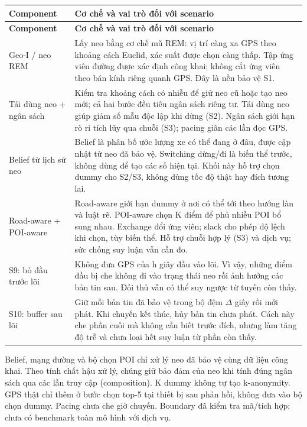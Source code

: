 \documentclass[10pt,a4paper]{article}
\begin{document}
\begingroup\small
\begin{longtable}{@{}P{4.105cm}P{12.814cm}@{}}
\toprule
\textbf{Component} & \textbf{Cơ chế và vai trò đối với scenario}\\\midrule
\endfirsthead
\toprule
\textbf{Component} & \textbf{Cơ chế và vai trò đối với scenario}\\\midrule
\endhead
\bottomrule\endfoot
Geo-I / neo REM & Lấy neo bằng cơ chế mũ REM: vị trí càng xa GPS theo khoảng cách Euclid, xác suất được chọn càng thấp. Tập ứng viên đường được xác định công khai; không cắt ứng viên theo bán kính riêng quanh GPS. Đây là nền bảo vệ S1.\\
\addlinespace[3pt]
Tái dùng neo + ngân sách & Kiểm tra khoảng cách có nhiễu để giữ neo cũ hoặc tạo neo mới; cả hai bước đều tiêu ngân sách riêng tư. Tái dùng neo giúp giảm số mẫu độc lập khi dừng (S2). Ngân sách giới hạn rò rỉ tích lũy qua chuỗi (S3); pacing giãn các lần đọc GPS.\\
\addlinespace[3pt]
Belief từ lịch sử neo & Belief là phân bố ước lượng xe có thể đang ở đâu, được cập nhật từ neo đã bảo vệ. Switching dừng/đi là biến thể trước, không dùng để tạo các số hiện tại. Khối này hỗ trợ chọn dummy cho S2/S3, không dùng tốc độ thật hay đích tương lai.\\
\addlinespace[3pt]
Road-aware + POI-aware & Road-aware giới hạn dummy ở nơi có thể tới theo hướng làn và luật rẽ. POI-aware chọn K điểm để phủ nhiều POI bổ sung nhau. Exchange đổi ứng viên; slack cho phép độ lệch khi chọn, tùy biến thể. Hỗ trợ chuỗi hợp lý (S3) và dịch vụ; sức chống suy luận vẫn cần đo.\\
\addlinespace[3pt]
S9: bỏ đầu trước lõi & Không đưa GPS của h giây đầu vào lõi. Vì vậy, những điểm đầu bị che không đi vào trạng thái neo rồi ảnh hưởng các bản tin sau. Đối thủ vẫn có thể suy ngược từ tuyến còn thấy.\\
\addlinespace[3pt]
S10: buffer sau lõi & Giữ mỗi bản tin đã bảo vệ trong bộ đệm $\Delta$ giây rồi mới phát. Khi chuyến kết thúc, hủy bản tin chưa phát. Cách này che phần cuối mà không cần biết trước đích, nhưng làm tăng độ trễ và chưa loại hết suy luận từ phần còn thấy.\\
\end{longtable}
\endgroup
Belief, mạng đường và bộ chọn POI chỉ xử lý neo đã bảo vệ cùng dữ liệu công khai. Theo tính chất hậu xử lý, chúng giữ bảo đảm của neo khi tính đúng ngân sách qua các lần truy cập (composition). K dummy không tự tạo k-anonymity. GPS thật chỉ thêm ở bước chọn top-5 tại thiết bị sau phản hồi, không đưa vào bộ chọn dummy. Pacing chưa che giờ chuyến. Boundary đã kiểm tra mã/tích hợp; chưa có benchmark toàn mô hình với dịch vụ.
\end{document}
